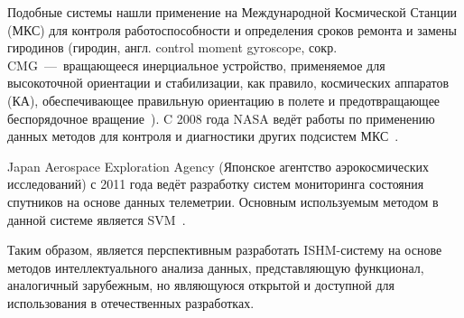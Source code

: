 Подобные системы нашли применение на Международной Космической Станции (МКС) для контроля работоспособности и определения сроков ремонта и замены гиродинов (гиродин, англ. control moment gyroscope, сокр. CMG~---~вращающееся инерциальное устройство, применяемое для высокоточной ориентации и стабилизации, как правило, космических аппаратов (КА), обеспечивающее правильную ориентацию в полете и предотвращающее беспорядочное вращение~\cite{WikiGirodyn}). C 2008 года NASA ведёт работы по применению данных методов для контроля и диагностики других подсистем МКС~\cite{IversonSHMforSpaceMissionOperations}.

Japan Aerospace Exploration Agency (Японское агентство аэрокосмических исследований) с 2011 года ведёт разработку систем мониторинга состояния спутников на основе данных телеметрии. Основным используемым методом в данной системе является SVM~\cite{SVMSatelliteMonitoring}.

Таким образом, является перспективным разработать ISHM-систему на основе методов интеллектуального анализа данных, представляющую функционал, аналогичный зарубежным, но являющуюся открытой и доступной для использования в отечественных разработках.